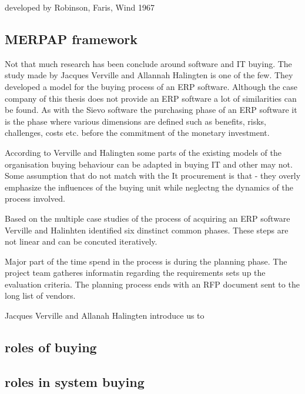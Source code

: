 \documentclass[12pt,a4paper,oneside,pdftex]{report}
\begin{document}
developed by Robinson, Faris, Wind 1967

\subsection{MERPAP framework}
Not that much research has been conclude around software and IT buying. The study made by Jacques Verville and Allannah Halingten is one of the few. They developed a model for the buying process of an ERP software. Although the case company of this thesis does not provide an ERP software a lot of similarities can be found. As with the Sievo software the purchasing phase of an ERP software it is the phase where various dimensions are defined such as benefits, risks, challenges, costs etc. before the commitment of the monetary investment. 

According to Verville and Halingten some parts of the existing models of the organisation buying behaviour can be adapted in buying IT and other may not. Some assumption that do not match with the It procurement is that
- they overly emphasize the influences of the buying unit while neglectng the dynamics of the process involved. 

Based on the multiple case studies of the process of acquiring an ERP software Verville and Halinhten identified six dinstinct common phases. These steps are not linear and can be concuted iteratively. 

Major part of the time spend in the process is during the planning phase. The project team gatheres informatin regarding the requirements sets up the evaluation criteria. The planning process ends with an RFP document sent to the long list of vendors. 


Jacques Verville and Allanah Halingten introduce us to 


\subsection{roles of buying}

\subsection{roles in system buying}

\end{document}
